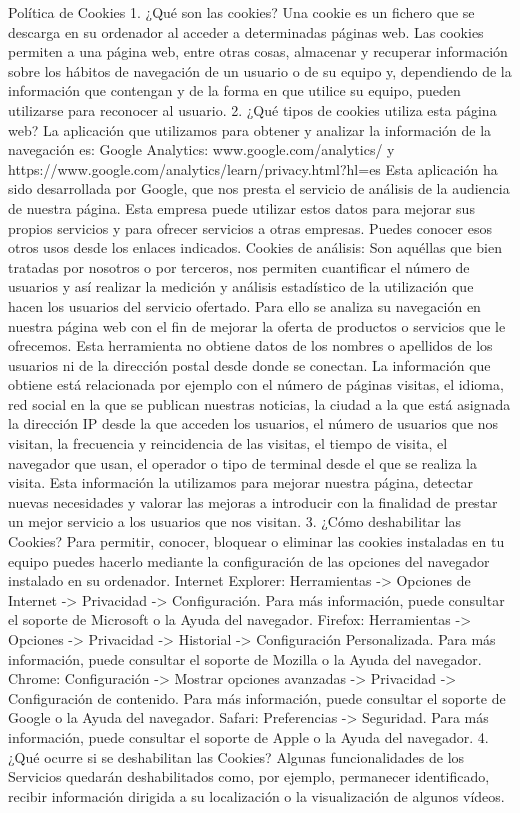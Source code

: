 \documentclass[10pt,a4paper]{article}
\begin{document}
\begin{enumerate}
Política de Cookies
1. ¿Qué son las cookies?
Una cookie es un fichero que se descarga en su ordenador al acceder a determinadas páginas web. Las cookies permiten a una página web, entre otras cosas, almacenar y recuperar información sobre los hábitos de navegación de un usuario o de su equipo y, dependiendo de la información que contengan y de la forma en que utilice su equipo, pueden utilizarse para reconocer al usuario.
2. ¿Qué tipos de cookies utiliza esta página web?
La aplicación que utilizamos para obtener y analizar la información de la navegación es: Google Analytics: www.google.com/analytics/ y https://www.google.com/analytics/learn/privacy.html?hl=es
Esta aplicación ha sido desarrollada por Google, que nos presta el servicio de análisis de la audiencia de nuestra página. Esta empresa puede utilizar estos datos para mejorar sus propios servicios y para ofrecer servicios a otras empresas. Puedes conocer esos otros usos desde los enlaces indicados.
Cookies de análisis: Son aquéllas que bien tratadas por nosotros o por terceros, nos permiten cuantificar el número de usuarios y así realizar la medición y análisis estadístico de la utilización que hacen los usuarios del servicio ofertado. Para ello se analiza su navegación en nuestra página web con el fin de mejorar la oferta de productos o servicios que le ofrecemos.
Esta herramienta no obtiene datos de los nombres o apellidos de los usuarios ni de la dirección postal desde donde se conectan. La información que obtiene está relacionada por ejemplo con el número de páginas visitas, el idioma, red social en la que se publican nuestras noticias, la ciudad a la que está asignada la dirección IP desde la que acceden los usuarios, el número de usuarios que nos visitan, la frecuencia y reincidencia de las visitas, el tiempo de visita, el navegador que usan, el operador o tipo de terminal desde el que se realiza la visita.
Esta información la utilizamos para mejorar nuestra página, detectar nuevas necesidades y valorar las mejoras a introducir con la finalidad de prestar un mejor servicio a los usuarios que nos visitan.
3. ¿Cómo deshabilitar las Cookies?
Para permitir, conocer, bloquear o eliminar las cookies instaladas en tu equipo puedes hacerlo mediante la configuración de las opciones del navegador instalado en su ordenador.
Internet Explorer: Herramientas -> Opciones de Internet -> Privacidad -> Configuración.
Para más información, puede consultar el soporte de Microsoft o la Ayuda del navegador.
Firefox: Herramientas -> Opciones -> Privacidad -> Historial -> Configuración Personalizada.
Para más información, puede consultar el soporte de Mozilla o la Ayuda del navegador.
Chrome: Configuración -> Mostrar opciones avanzadas -> Privacidad -> Configuración de contenido.
Para más información, puede consultar el soporte de Google o la Ayuda del navegador.
Safari: Preferencias -> Seguridad.
Para más información, puede consultar el soporte de Apple o la Ayuda del navegador.
4. ¿Qué ocurre si se deshabilitan las Cookies?
Algunas funcionalidades de los Servicios quedarán deshabilitados como, por ejemplo, permanecer identificado, recibir información dirigida a su localización o la visualización de algunos vídeos.


\end{enumerate}
\end{document}

